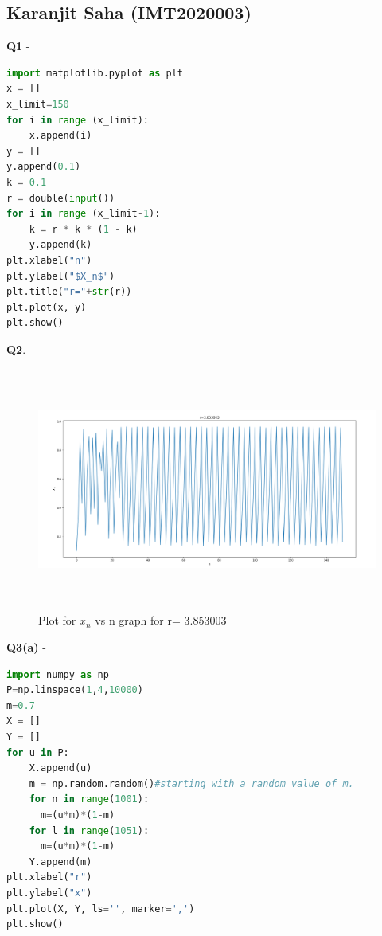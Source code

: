 \documentclass[11pt]{scrartcl} %
\begin{document}
\subsection{Karanjit Saha (IMT2020003)}
\textbf{Q1} -
\begin{lstlisting}[language=Python, caption= Code for plotting $X_n$ vs n graph for a given r]
import matplotlib.pyplot as plt
x = []
x_limit=150
for i in range (x_limit):
    x.append(i)
y = []
y.append(0.1)
k = 0.1
r = double(input())
for i in range (x_limit-1):
    k = r * k * (1 - k)
    y.append(k)
plt.xlabel("n")
plt.ylabel("$X_n$")
plt.title("r="+str(r))
plt.plot(x, y)
plt.show()
\end{lstlisting}
\textbf{Q2}.
\begin{figure}[h] %
	\centering
	\includegraphics[width=12cm, height=8cm]{Karanjit.png} %
	\caption {Plot for $x_n$ vs n graph for r= 3.853003}
\end{figure}
\newpage
\textbf{Q3(a)} -
\begin{lstlisting}[language=Python, caption= Bifurcation diagram]
import numpy as np
P=np.linspace(1,4,10000)
m=0.7
X = []
Y = []
for u in P:
    X.append(u)
    m = np.random.random()#starting with a random value of m.
    for n in range(1001):
      m=(u*m)*(1-m)
    for l in range(1051):
      m=(u*m)*(1-m)
    Y.append(m)
plt.xlabel("r")
plt.ylabel("x")
plt.plot(X, Y, ls='', marker=',')
plt.show()
\end{lstlisting}
\newpage
\end{document}
